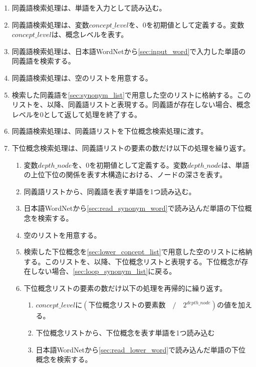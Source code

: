 \begin{enumerate}
    \item 同義語検索処理は、単語を入力として読み込む。
    \label{sec:input_word}
    \item 同義語検索処理は、変数$concept\_level$を、0を初期値として定義する。変数$concept\_level$は、概念レベルを表す。
    \item 同義語検索処理は、日本語WordNetから\ref{sec:input_word}で入力した単語の同義語を検索する。
    \item 同義語検索処理は、空のリストを用意する。
    \label{sec:synonym_list}
    \item 検索した同義語を\ref{sec:synonym_list}で用意した空のリストに格納する。このリストを、以降、同義語リストと表現する。同義語が存在しない場合、概念レベルを0として返して処理を終了する。
    \item 同義語検索処理は、同義語リストを下位概念検索処理に渡す。
    \item 下位概念検索処理は、同義語リストの要素の数だけ以下の処理を繰り返す。
    \label{sec:loop_synonym_list}
        \begin{enumerate}
            \item 変数$depth\_node$を、0を初期値として定義する。変数$depth\_node$は、単語の上位下位の関係を表す木構造における、ノードの深さを表す。
            \item 同義語リストから、同義語を表す単語を1つ読み込む。
            \label{sec:read_synonym_word}
            \item 日本語WordNetから\ref{sec:read_synonym_word}で読み込んだ単語の下位概念を検索する。
            \item 空のリストを用意する。
            \label{sec:lower_concept_list}
            \item 検索した下位概念を\ref{sec:lower_concept_list}で用意した空のリストに格納する。このリストを、以降、下位概念リストと表現する。下位概念が存在しない場合、\ref{sec:loop_synonym_list}に戻る。
            \item 下位概念リストの要素の数だけ以下の処理を再帰的に繰り返す。
            \label{sec:loop_lower_list}
                \begin{enumerate}
                    \item $concept\_level$に$(下位概念リストの要素数\quad/\quad2^{depth\_node})$の値を加える。
                    \item 下位概念リストから、下位概念を表す単語を1つ読み込む
                    \label{sec:read_lower_word}
                    \item 日本語WordNetから\ref{sec:read_lower_word}で読み込んだ単語の下位概念を検索する。

\end{enumerate}
\end{enumerate}
\end{enumerate}
